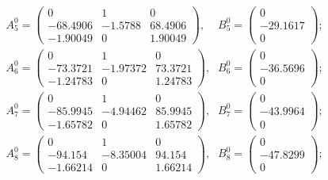 \begin{equation*}
\begin{array}{lr}
A_5^0 = \left(\begin{array}{ccc}
0    &    1    &    0 \\
-68.4906    &    -1.5788    &    68.4906 \\
-1.90049    &    0    &    1.90049
\end{array}\right)\mbox{,} &
B_5^0 = \left(\begin{array}{c}
0 \\
-29.1617 \\
0
\end{array}\right)\mbox{;} \\

A_6^0 = \left(\begin{array}{ccc}
0    &    1    &    0 \\
-73.3721    &    -1.97372    &    73.3721 \\
-1.24783    &    0    &    1.24783
\end{array}\right)\mbox{,} &
B_6^0 = \left(\begin{array}{c}
0 \\
-36.5696 \\
0
\end{array}\right)\mbox{;} \\

A_7^0 = \left(\begin{array}{ccc}
0    &    1    &    0 \\
-85.9945    &    -4.94462    &    85.9945 \\
-1.65782    &    0    &    1.65782
\end{array}\right)\mbox{,} &
B_7^0 = \left(\begin{array}{c}
0 \\
-43.9964 \\
0
\end{array}\right)\mbox{;} \\

A_8^0 = \left(\begin{array}{ccc}
0    &    1    &    0 \\
-94.154    &    -8.35004    &    94.154 \\
-1.66214    &    0    &    1.66214
\end{array}\right)\mbox{,} &
B_8^0 = \left(\begin{array}{c}
0 \\
-47.8299 \\
0
\end{array}\right)\mbox{;} \\


\end{array}
\end{equation*}
